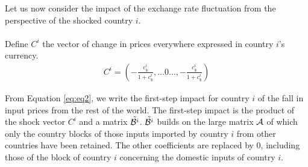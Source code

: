\documentclass[11pt,a4paper]{paper} %
\begin{document}
Let us now consider the impact of the exchange rate fluctuation from the perspective of the shocked country $i$.\\
\\%
%
%
%
Define $C^i$ the vector of change in prices everywhere expressed in country $i$'s currency.\\
\begin{eqnarray*}
C^i = \left(-\frac{c_\$^i}{1+c_\$^i},\ldots0\ldots,-\frac{c_\$^i}{1+c_\$^i} \right)
\end{eqnarray*}

From Equation \ref{eq:eq2}, we write the first-step impact for country $i$ of the fall in input prices from the rest of the world. 
The first-step impact is the product of the shock vector $C^i$ and a matrix ${\tilde{{\cal B}^i}}$. ${\tilde{{\cal B}^i}}$ builds on the large matrix ${\cal A}$ of which only the country blocks of those inputs imported by country $i$ from other countries have been retained. 
The other coefficients are replaced by 0, including those of the block of country $i$ concerning the domestic inputs of country $i$. \\
\end{document}

